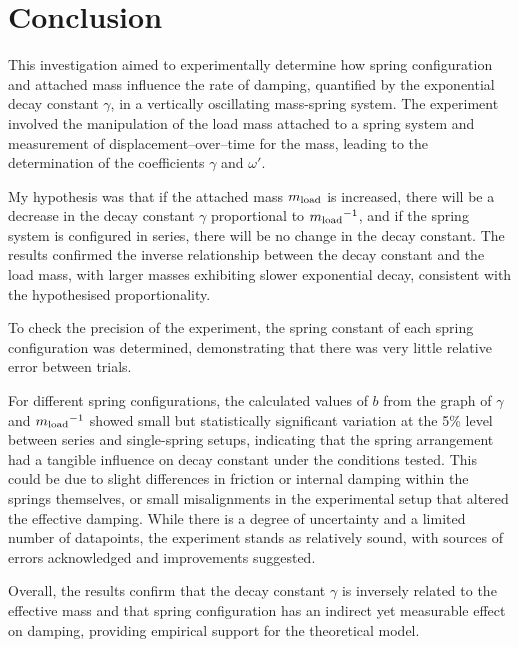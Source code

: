 \section{Conclusion}
\setlength{\parindent}{15pt}

This investigation aimed to experimentally determine how spring configuration and attached mass influence the rate of damping, quantified by the exponential decay constant $\gamma$, in a vertically oscillating mass-spring system. The experiment involved the manipulation of the load mass attached to a spring system and measurement of displacement--over--time for the mass, leading to the determination of the coefficients $\gamma$ and $\omega'$.

 My hypothesis was that if the attached mass $m{\textsubscript{load}}$ is increased, there will be a decrease in the decay constant $\gamma$ proportional to $m{\textsubscript{load}}^{-1}$, and if the spring system is configured in series, there will be no change in the decay constant. The results confirmed the inverse relationship between the decay constant and the load mass, with larger masses exhibiting slower exponential decay, consistent with the hypothesised proportionality.

To check the precision of the experiment, the spring constant of each spring configuration was determined, demonstrating that there was very little relative error between trials.

For different spring configurations, the calculated values of $b$ from the graph of $\gamma$ and $m{\textsubscript{load}}^{-1}$ showed small but statistically significant variation at the 5\% level between series and single-spring setups, indicating that the spring arrangement had a tangible influence on decay constant under the conditions tested. This could be due to slight differences in friction or internal damping within the springs themselves, or small misalignments in the experimental setup that altered the effective damping. While there is a degree of uncertainty and a limited number of datapoints, the experiment stands as relatively sound, with sources of errors acknowledged and improvements suggested.

Overall, the results confirm that the decay constant $\gamma$ is inversely related to the effective mass and that spring configuration has an indirect yet measurable effect on damping, providing empirical support for the theoretical model.